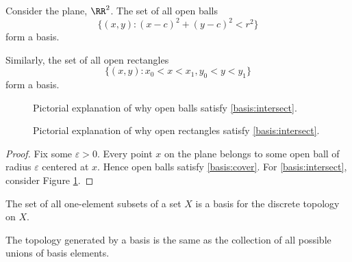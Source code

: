 \documentclass{article}
\begin{document}
\begin{example}\label{ex:openballsopenrectsbasis}
    Consider the plane, $\RR^2$.
    The set of all open balls 
    \[
        \{(x,y): (x-c)^2 + (y-c)^2 < r^2\}
    \]
    form a basis.

    Similarly, the set of all open rectangles
    \[
        \{(x,y): x_0 < x < x_1, y_0 < y < y_1\}
    \]
    form a basis.
\end{example}

\begin{figure}
    \centering
    \caption{Pictorial explanation of why open balls satisfy \ref{basis:intersect}.}
    \label{fig:openballb2}
\end{figure}
\begin{figure}
    \centering
    \caption{Pictorial explanation of why open rectangles satisfy \ref{basis:intersect}.}
\end{figure}

\begin{proof}
    Fix some $\varepsilon > 0$.
    Every point $x$ on the plane belongs to some open ball of radius $\varepsilon$ centered at $x$.
    Hence open balls satisfy \ref{basis:cover}.
    For \ref{basis:intersect}, consider Figure \ref{fig:openballb2}.

\end{proof}

\begin{example}
    The set of all one-element subsets of a set $X$ is a basis for the discrete topology on $X$.
\end{example}


\begin{lemma}
    The topology generated by a basis is the same as the collection of all possible unions of basis elements.
\end{lemma}
\end{document}
